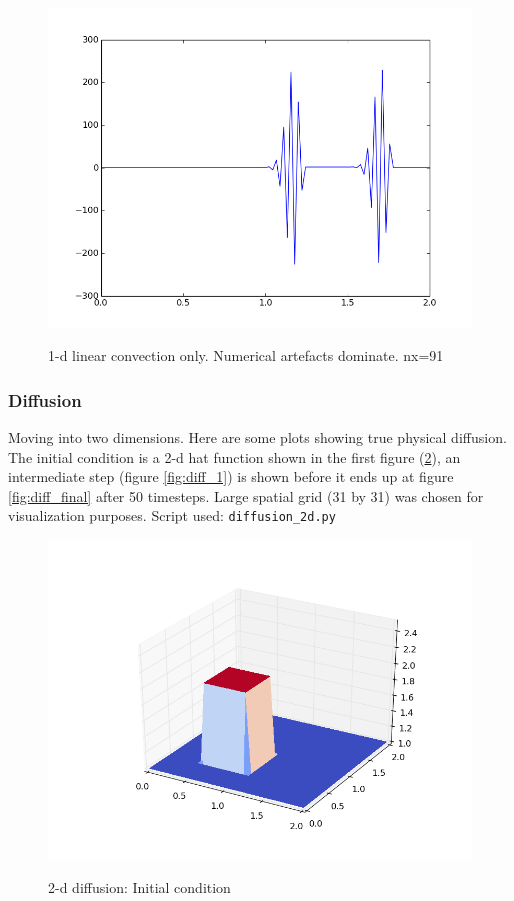 \documentclass[11pt]{article}
\begin{document}
{	\begin{figure}[num_diff_too_fine_explode]
	\centering
	\caption{1-d linear convection only. Numerical artefacts dominate. nx=91}
	\includegraphics[scale=0.8]{cfl_explode.png}
	\label{fig:num_diff_too_fine_explode}
	\end{figure}

\subsubsection{Diffusion}
Moving into two dimensions. Here are some plots showing true physical diffusion.
The initial condition is a 2-d hat function shown in the first figure (\ref{fig:diff_0}),
an intermediate step (figure \ref{fig:diff_1}) is shown before it ends up at figure
\ref{fig:diff_final} after 50 timesteps. Large spatial grid (31 by 31) was chosen
for visualization purposes. Script used: \texttt{diffusion\_2d.py}

	\begin{figure}[diff_0]
	\centering
	\caption{2-d diffusion: Initial condition}
	\includegraphics[scale=0.8]{diff_0.png}
	\label{fig:diff_0}
	\end{figure}

}
\end{document}
